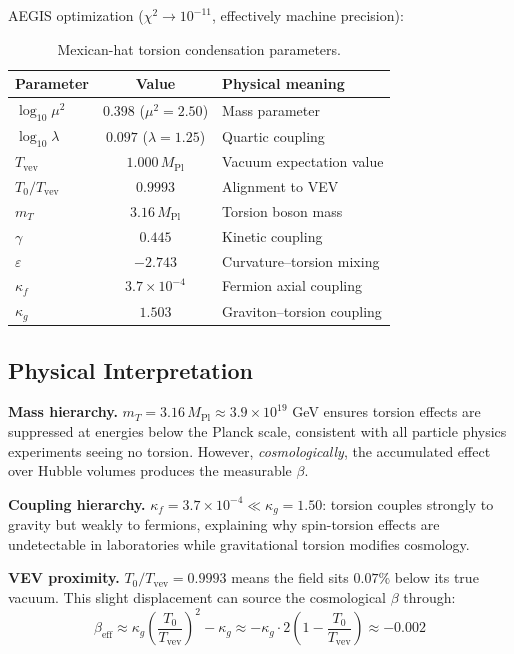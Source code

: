 \documentclass[twocolumn,prd,superscriptaddress,nofootinbib]{revtex4-2}
\begin{document}
AEGIS optimization ($\chi^2 \to 10^{-11}$, effectively machine precision):

\begin{table}[h]
\caption{Mexican-hat torsion condensation parameters.}
\begin{ruledtabular}
\begin{tabular}{lcl}
Parameter & Value & Physical meaning \\
\hline
$\log_{10}\mu^2$ & $0.398$ ($\mu^2 = 2.50$) & Mass parameter \\
$\log_{10}\lambda$ & $0.097$ ($\lambda = 1.25$) & Quartic coupling \\
$T_\text{vev}$ & $1.000\,M_\text{Pl}$ & Vacuum expectation value \\
$T_0/T_\text{vev}$ & $0.9993$ & Alignment to VEV \\
$m_T$ & $3.16\,M_\text{Pl}$ & Torsion boson mass \\
$\gamma$ & $0.445$ & Kinetic coupling \\
$\varepsilon$ & $-2.743$ & Curvature--torsion mixing \\
$\kappa_f$ & $3.7\times10^{-4}$ & Fermion axial coupling \\
$\kappa_g$ & $1.503$ & Graviton--torsion coupling \\
\end{tabular}
\end{ruledtabular}
\end{table}

\subsection{Physical Interpretation}

\textbf{Mass hierarchy.} $m_T = 3.16\,M_\text{Pl} \approx 3.9 \times 10^{19}$ GeV ensures torsion effects are suppressed at energies below the Planck scale, consistent with all particle physics experiments seeing no torsion. However, \emph{cosmologically}, the accumulated effect over Hubble volumes produces the measurable $\beta$.

\textbf{Coupling hierarchy.} $\kappa_f = 3.7\times10^{-4} \ll \kappa_g = 1.50$: torsion couples strongly to gravity but weakly to fermions, explaining why spin-torsion effects are undetectable in laboratories while gravitational torsion modifies cosmology.

\textbf{VEV proximity.} $T_0/T_\text{vev} = 0.9993$ means the field sits $0.07\%$ below its true vacuum. This slight displacement can source the cosmological $\beta$ through:
\begin{equation}
\beta_\text{eff} \approx \kappa_g\left(\frac{T_0}{T_\text{vev}}\right)^2 - \kappa_g \approx -\kappa_g \cdot 2\left(1 - \frac{T_0}{T_\text{vev}}\right) \approx -0.002
\end{equation}
\end{document}

